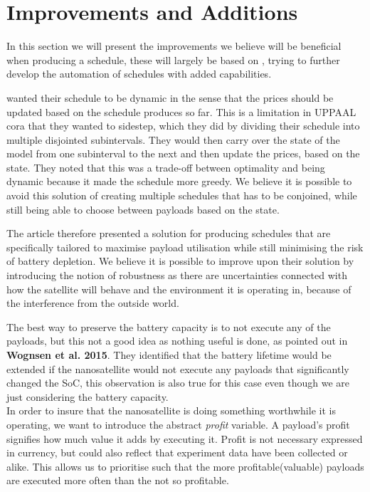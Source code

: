 \section{Improvements and Additions}
In this section we will present the improvements we believe will be beneficial when producing a schedule, these will largely be based on \cite{gomx3}, trying to further develop the automation of schedules with added capabilities.

\cite{gomx3} wanted their schedule to be dynamic in the sense that the prices should be updated based on the schedule produces so far. This is a limitation in UPPAAL \gls {cora} that they wanted to sidestep, which they did by dividing their schedule into multiple disjointed subintervals. They would then carry over the state of the model from one subinterval to the next and then update the prices, based on the state. They noted that this was a trade-off between optimality and being dynamic because it made the schedule more greedy. We believe it is possible to avoid this solution of creating multiple schedules that has to be conjoined, while still being able to choose between payloads based on the state. %

The article therefore presented a solution for producing schedules that are specifically tailored to maximise payload utilisation while still minimising the risk of battery depletion. We believe it is possible to improve upon their solution by introducing the notion of robustness as there are uncertainties connected with how the satellite will behave and the environment it is operating in, because of the interference from the outside world.

The best way to preserve the battery capacity is to not execute any of the payloads, but this not a good idea as nothing useful is done, as pointed out in \textbf{Wognsen et al. 2015}\cite{score_function}. They identified that the battery lifetime would be extended if the nanosatellite would not execute any payloads that significantly changed the SoC, this observation is also true for this case even though we are just considering the battery capacity.\\
In order to insure that the nanosatellite is doing something worthwhile it is operating, we want to introduce the abstract \textit{profit} variable. A payload's profit signifies how much value it adds by executing it. Profit is not necessary expressed in currency, but could also reflect that experiment data have been collected or alike. This allows us to prioritise such that the more profitable(valuable) payloads are executed more often than the not so profitable.

